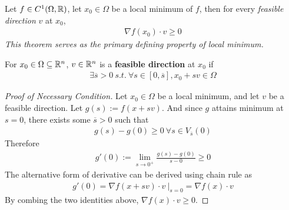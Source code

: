 \documentclass{article}
\begin{document}
   	\begin{theorem}
   		Let $f \in C^1(\Omega, \mathbb{R})$, let $x_0 \in \Omega$ be a local minimum of $f$, then for every \emph{feasible direction} $v$ at $x_0$,
   		\begin{align}
   			\nabla f(x_0) \cdot v \geq 0
   		\end{align}
   		\emph{This theorem serves as the primary defining property of local minimum.}
   	\end{theorem}
   	
   	\begin{definition}
   		For $x_0 \in \Omega \subseteq \mathbb{R}^n$,  $v \in \mathbb{R}^n$ is a \textbf{feasible direction} at $x_0$ if
   		\begin{align}
   			\exists \overline{s} > 0\ s.t.\ \forall s \in [0, \overline{s}], x_0 + s v \in \Omega
   		\end{align}
   	\end{definition}
   	
   	\begin{proof}[Proof of Necessary Condition]
   		Let $x_0 \in \Omega$ be a local minimum, and let $v$ be a feasible direction.
   		Let $g(s) := f(x + sv)$. And since $g$ attains minimum at $s=0$, there exists some $\overline{s} > 0$ such that 
   		\begin{align}
   			g(s) - g(0) \geq 0\ \forall s \in V_{\overline{s}}(0)
   		\end{align}
   		Therefore
   		\begin{align}
   			g'(0) := \lim_{s \to 0^+} \frac{g(s) - g(0)}{s - 0} \geq 0
   		\end{align}
   		The alternative form of derivative can be derived using chain rule as
   		\begin{align}
   			g'(0) = \nabla f(x + sv) \cdot v\ |_{s=0} = \nabla f(x) \cdot v
   		\end{align}
   		By combing the two identities above, $\nabla f(x) \cdot v \geq 0$.
   	\end{proof}
   	
   	
\end{document}

